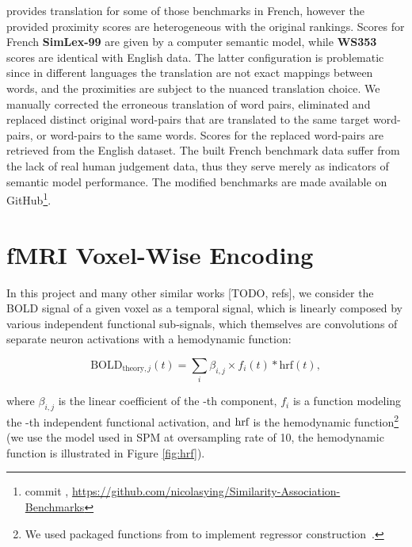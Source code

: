 \label{subsection:frenchbenchmarkdataconstruction}
\textcite{freitasSemanticRelatednessAll2016} provides translation for some of those benchmarks in French, however the provided proximity scores are heterogeneous with the original rankings. Scores for French \textbf{SimLex-99} are given by a computer semantic model, while \textbf{WS353} scores are identical with English data. The latter configuration is problematic since in different languages the translation are not exact mappings between words, and the proximities are subject to the nuanced translation choice. We manually corrected the erroneous translation of word pairs, eliminated and replaced distinct original word-pairs that are translated to the same target word-pairs, or word-pairs to the same words. Scores for the replaced word-pairs are retrieved from the English dataset. The built French benchmark data suffer from the lack of real human judgement data, thus they serve merely as indicators of semantic model performance. The modified benchmarks are made available on GitHub\footnote{commit , \url{https://github.com/nicolasying/Similarity-Association-Benchmarks}}.

\section{fMRI Voxel-Wise Encoding}


In this project and many other similar works [TODO, refs], we consider the BOLD signal of a given voxel  as a temporal signal, which is linearly composed by various independent functional sub-signals, which themselves are convolutions of separate neuron activations with a hemodynamic function: 

\begin{equation}
    \text{BOLD}_{\text{theory}, j}(t) = \sum_i {\beta_{i,j} \times f_{i}(t) * \text{hrf}(t),}
\label{eqn:boldlinear}
\end{equation}

where \(\beta_{i,j}\) is the linear coefficient of the -th component, \(f_{i}\) is a function modeling the -th independent functional activation, and \(\textnormal{hrf}\) is the hemodynamic function\footnote{We used packaged functions from  to implement regressor construction~\parencite{abrahamMachineLearningNeuroimaging2014}.} (we use the model used in SPM at oversampling rate of 10, the hemodynamic function is illustrated in Figure \ref{fig:hrf}).

